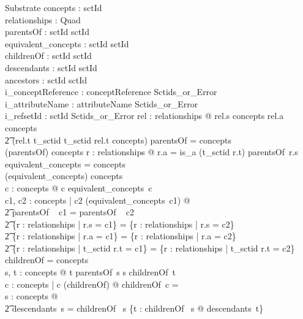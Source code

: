 \documentclass{article}
\begin{document}
\begin{schema}{Substrate}
   concepts : \power sctId \\
   relationships : \power Quad  \\
   parentsOf : sctId \pfun \power sctId \\
   equivalent\_concepts : sctId \pfun \power sctId \\
\also
   childrenOf : sctId \pfun \power sctId \\
   descendants : sctId \pfun \power sctId \\
   ancestors : sctId \pfun \power sctId \\
\also
   i\_conceptReference : conceptReference \fun Sctids\_or\_Error \\
   i\_attributeName : attributeName \fun Sctids\_or\_Error \\
   i\_refsetId : sctId \fun Sctids\_or\_Error
\where
   \forall rel : relationships @  rel.s \in concepts \land rel.a \in concepts \land \\
\t2 (rel.t \in \ran t\_sctid \implies t\_sctid \inv rel.t \in concepts)
\also
   \dom parentsOf = concepts \\
   \bigcup (\ran parentsOf) \subseteq concepts
\also
   \forall r : relationships @ r.a = is\_a \implies (t\_sctid \inv r.t) \in parentsOf~r.s
\also
   \dom equivalent\_concepts = concepts \\
   \bigcup (\ran equivalent\_concepts) \subseteq concepts \\
  \forall c : concepts @ c \in equivalent\_concepts~c \\
  \forall c1, c2 : concepts | c2 \in (equivalent\_concepts~c1) @ \\
\t2 parentsOf ~ c1 = parentsOf ~ c2 \land \\
\t2 \{r : relationships | r.s = c1\} = \{r : relationships | r.s = c2\} \land \\
\t2 \{r : relationships | r.a = c1\} = \{r : relationships | r.a = c2\} \land \\
\t2 \{r : relationships | t\_sctid \inv r.t = c1\} = \{r : relationships | t\_sctid \inv r.t = c2\} 
\also
    \dom childrenOf = concepts \\
    \forall s, t : concepts @ t \in parentsOf~s \iff s \in childrenOf~t  \\
    \forall c : concepts | c \notin \bigcup (\ran childrenOf) @ childrenOf~c = \emptyset \\
    \forall s : concepts @ \\
\t2 descendants~s = childrenOf~ s \cup \bigcup \{t : childrenOf~ s @ descendants~t\} \\

\end{schema}
\end{document}
